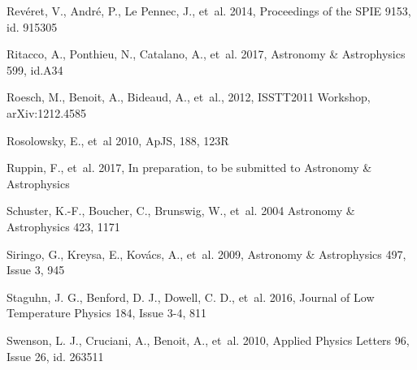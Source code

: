 \begin{thebibliography}{99}
Rev\'eret, V., Andr\'e, P., Le Pennec, J., {et~al.} 2014, 
Proceedings of the SPIE 9153, id. 915305

Ritacco, A., Ponthieu, N., Catalano, A., {et~al.} 2017, 
Astronomy \& Astrophysics 599, id.A34

Roesch, M., Benoit, A., Bideaud, A., {et~al.}, 2012, 
ISSTT2011 Workshop, arXiv:1212.4585

Rosolowsky, E., {et~al} 2010, ApJS, 188, 123R

Ruppin, F., {et~al.} 2017, 
In preparation, to be submitted to Astronomy \& Astrophysics

Schuster, K.-F., Boucher, C., Brunswig, W., {et~al.} 2004 
Astronomy \& Astrophysics 423, 1171

Siringo, G., Kreysa, E., Kov\'acs, A., {et~al.} 2009, 
Astronomy \& Astrophysics 497, Issue 3, 945

Staguhn, J. G., Benford, D. J., Dowell, C. D., {et~al.} 2016,
Journal of Low Temperature Physics 184, Issue 3-4, 811

Swenson, L. J., Cruciani, A., Benoit, A., {et~al.} 2010, 
Applied Physics Letters 96, Issue 26, id. 263511

  
  




\end{thebibliography}
